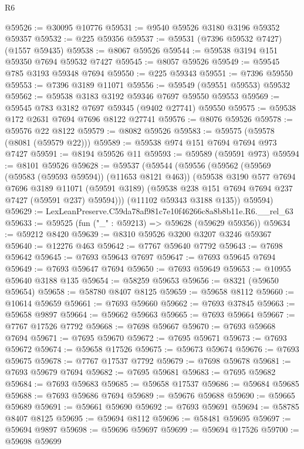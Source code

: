 \begin{lexlean}{R6}
\begin{coremodule}
@59526 := @30095 @10776
@59531 := @9540 @59526 @3180 @3196 @59352 @59357
@59532 := @225 @59356
@59537 := @59531 (@7396 @59532 @7427) (@1557 @59435)
@59538 := @8067 @59526
@59544 := @59538 @3194 @151 @59350 @7694 @59532 @7427
@59545 := @8057 @59526
@59549 := @59545 @785 @3193 @59348 @7694
@59550 := @225 @59343
@59551 := @7396 @59550
@59553 := @7396 @3189 @11071
@59556 := @59549 (@59551 @59553) @59532
@59562 := @59538 @3183 @3192 @59346 @7697 @59550 @59553
@59569 := @59545 @783 @3182 @7697 @59345 (@9402 @27741) @59550
@59575 := @59538 @172 @2631 @7694 @7696 @8122 @27741
@59576 := @8076 @59526
@59578 := @59576 @22 @8122
@59579 := @8082 @59526
@59583 := @59575 (@59578 (@8081 (@59579 @22)))
@59589 := @59538 @974 @151 @7694 @7694 @973 @7427
@59591 := @8194 @59526 @11
@59593 := @59589 (@59591 @973)
@59594 := @8101 @59526
@59628 := @59537
    (@59544
      (@59556
        (@59562
          (@59569 (@59583 (@59593 @59594)) (@11653 @8121 @463))
          (@59538
            @3190
            @577
            @7694
            @7696
            @3189
            @11071
            (@59591 @3189)
            (@59538 @238 @151 @7694 @7694 @237 @7427 (@59591 @237) @59594)))
        (@11102 @59343 @3188 @135))
      @59594)
@59629 := LexLeanPreserve.C59da78af981c7e10f46266c8a8b8b11e.R6.__rel_63
@59633 := @59525 (fun ("_" : @59213) => @59628 (@59629 @59356))
@59634 := @59212 @8420
@59639 := @8310 @59526 @3200 @3207 @3246 @59367
@59640 := @12276 @463
@59642 := @7767 @59640 @7792
@59643 := @7698 @59642
@59645 := @7693 @59643 @7697
@59647 := @7693 @59645 @7694
@59649 := @7693 @59647 @7694
@59650 := @7693 @59649
@59653 := @10955 @59640 @3188 @135
@59654 := @58259 @59653
@59656 := @8321 (@59650 @59654)
@59658 := @58780 @8407 @8125
@59659 := @59658 @8112
@59660 := @10614 @59659
@59661 := @7693 @59660
@59662 := @7693 @37845
@59663 := @59658 @9897
@59664 := @59662 @59663
@59665 := @7693 @59664
@59667 := @7767 @17526 @7792
@59668 := @7698 @59667
@59670 := @7693 @59668 @7694
@59671 := @7695 @59670
@59672 := @7695 @59671
@59673 := @7693 @59672
@59674 := @59658 @17526
@59675 := @59673 @59674
@59676 := @7693 @59675
@59678 := @7767 @17537 @7792
@59679 := @7698 @59678
@59681 := @7693 @59679 @7694
@59682 := @7695 @59681
@59683 := @7695 @59682
@59684 := @7693 @59683
@59685 := @59658 @17537
@59686 := @59684 @59685
@59688 := @7693 @59686 @7694
@59689 := @59676 @59688
@59690 := @59665 @59689
@59691 := @59661 @59690
@59692 := @7693 @59691
@59694 := @58785 @8407 @8125
@59695 := @59694 @8112
@59696 := @58481 @59695
@59697 := @59694 @9897
@59698 := @59696 @59697
@59699 := @59694 @17526
@59700 := @59698 @59699

\end{coremodule}
\end{lexlean}
